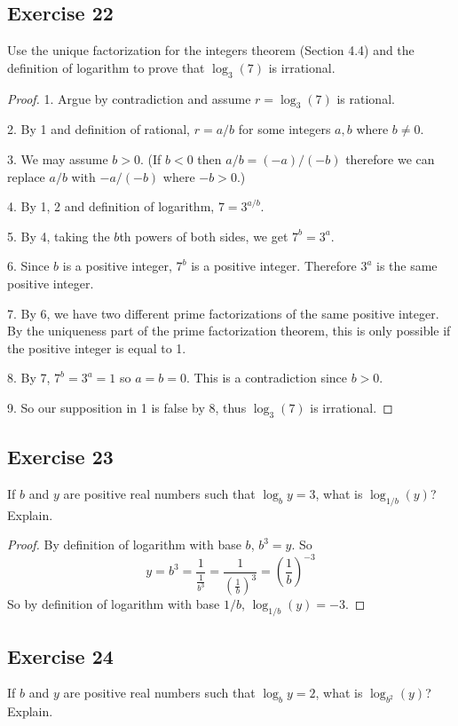 \documentclass[14pt]{extarticle}
\begin{document}
\subsection{Exercise 22}
Use the unique factorization for the integers theorem (Section 4.4) and the definition of logarithm to prove that
$\log_3(7)$ is irrational.

\begin{proof}
    1. Argue by contradiction and assume \(r = \log_3(7)\) is rational.

    2. By 1 and definition of rational, \(r = a / b\) for some integers $a,b$ where $b \neq 0$.

    3. We may assume \(b > 0\). (If \(b < 0\) then \(a/b = (-a)/(-b)\) therefore we can replace $a/b$ with $-a/(-b)$
    where \(-b > 0\).)

    4. By 1, 2 and definition of logarithm, \(7 = 3^{a/b}\).

    5. By 4, taking the $b$th powers of both sides, we get \(7^b = 3^a\).

    6. Since \(b\) is a positive integer, \(7^b\) is a positive integer. Therefore \(3^a\) is the same positive integer.

    7. By 6, we have two different prime factorizations of the same positive integer. By the uniqueness part of the prime
    factorization theorem, this is only possible if the positive integer is equal to 1.

    8. By 7, \(7^b = 3^a = 1\) so \(a = b = 0\). This is a contradiction since \(b > 0\).

    9. So our supposition in 1 is false by 8, thus \(\log_3(7)\) is irrational.
\end{proof}

\subsection{Exercise 23}
If $b$ and $y$ are positive real numbers such that \(\log_b y = 3\), what is \(\log_{1/b}(y)\)? Explain.

\begin{proof}
    By definition of logarithm with base $b$, \(b^3 = y\). So
    \[
        y = b^3 = \frac{1}{\frac{1}{b^3}} = \frac{1}{\left(\frac{1}{b}\right)^3} = \left(\frac{1}{b}\right)^{-3}
    \]
    So by definition of logarithm with base $1/b$, \(\log_{1/b}(y) = -3\).
\end{proof}

\subsection{Exercise 24}
If $b$ and $y$ are positive real numbers such that \(\log_b y = 2\), what is \(\log_{b^2}(y)\)? Explain.
\end{document}
